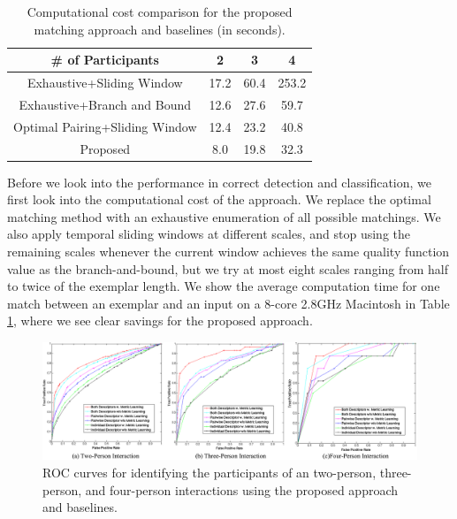 \documentclass[10pt,twocolumn,letterpaper]{article}
\begin{document}
\begin{table}[ht]
\centering \caption{Computational cost comparison for the proposed matching approach and baselines (in seconds).}
\footnotesize{
\begin{tabular}{|c|c|c|c|}
\hline    \# of Participants &  2  &  3  &  4   \\
\hline   Exhaustive+Sliding Window & 17.2   & 60.4   & 253.2   \\
\hline  Exhaustive+Branch and Bound &  12.6 &  27.6  &   59.7 \\
\hline  Optimal Pairing+Sliding Window & 12.4  & 23.2   &  40.8  \\
\hline  Proposed & 8.0  &  19.8  &  32.3  \\
\hline 
\end{tabular}
}
\label{computecost}
\end{table}


Before we look into the performance in correct detection and classification, we first look into the computational cost of the approach. We replace the optimal matching method with an exhaustive enumeration of all possible matchings. We also apply temporal sliding windows at different scales, and stop using the remaining scales whenever the current window achieves the same quality function value as the branch-and-bound, but we try at most eight scales ranging from half to twice of the exemplar length. We show the average computation time for one match between an exemplar and an input on a 8-core 2.8GHz Macintosh in Table \ref{computecost}, where we see clear savings for the proposed approach.


\begin{figure}[t]
\begin{center}
\includegraphics[scale=2.5]{ROC.png}
\end{center}
\caption{ROC curves for identifying the participants of an two-person, three-person, and four-person interactions using the proposed approach and baselines. }
\label{ROC}
\end{figure}
\end{document}
